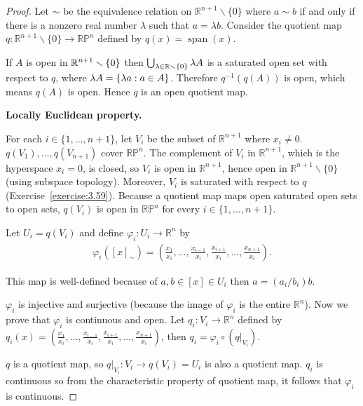 \begin{proof}
	Let $\sim$ be the equivalence relation on $\mathbb{R}^{n+1}\smallsetminus\{0\}$ where $a\sim b$ if and only if there is a nonzero real number $\lambda$ such that $a = \lambda b$. Consider the quotient map $q: \mathbb{R}^{n+1}\smallsetminus\{0\} \to \mathbb{RP}^{n}$ defined by $q(x) = \operatorname{span}(x)$.

	If $A$ is open in $\mathbb{R}^{n+1}\smallsetminus\left\{{0}\right\}$ then $\bigcup_{\lambda\in\mathbb{R}\smallsetminus\left\{{0}\right\}}\lambda A$ is a saturated open set with respect to $q$, where $\lambda A = \left\{{ \lambda a : a\in A }\right\}$. Therefore $q^{-1}(q(A))$ is open, which means $q(A)$ is open. Hence $q$ is an open quotient map.

	\textbf{Locally Euclidean property.}

	For each $i\in \{ 1, \ldots, n+1 \}$, let $V_{i}$ be the subset of $\mathbb{R}^{n+1}$ where $x_{i} \ne 0$. $q(V_{1}), \ldots, q(V_{n+1})$ cover $\mathbb{RP}^{n}$. The complement of $V_{i}$ in $\mathbb{R}^{n+1}$, which is the hyperspace $x_{i} = 0$, is closed, so $V_{i}$ is open in $\mathbb{R}^{n+1}$, hence open in $\mathbb{R}^{n+1}\smallsetminus\{0\}$ (using subspace topology). Moreover, $V_{i}$ is saturated with respect to $q$ (Exercise~\ref{exercise:3.59}). Because a quotient map maps open saturated open sets to open sets, $q(V_{i})$ is open in $\mathbb{RP}^{n}$ for every $i\in \{ 1, \ldots, n+1 \}$.

	Let $U_{i} = q(V_{i})$ and define $\varphi_{i}: U_{i} \to \mathbb{R}^{n}$ by
	\begin{align*}
		\varphi_{i}({[x]}_{\sim}) = \left(\frac{x_{1}}{x_{i}}, \ldots, \frac{x_{i-1}}{x_{i}}, \frac{x_{i+1}}{x_{i}}, \ldots, \frac{x_{n+1}}{x_{i}}\right).
	\end{align*}

	This map is well-defined because of $a, b \in [x]\in U_{i}$ then $a = (a_{i}/b_{i})b$.

	$\varphi_{i}$ is injective and surjective (because the image of $\varphi_{i}$ is the entire $\mathbb{R}^{n}$). Now we prove that $\varphi_{i}$ is continuous and open. Let $q_{i}: V_{i} \to \mathbb{R}^{n}$ defined by $q_{i}(x) = \left(\frac{x_{1}}{x_{i}}, \ldots, \frac{x_{i-1}}{x_{i}}, \frac{x_{i+1}}{x_{i}}, \ldots, \frac{x_{n+1}}{x_{i}}\right)$, then $q_{i} = \varphi_{i}\circ (q\vert_{V_{i}})$.

	$q$ is a quotient map, so $q\vert_{V_{i}}: V_{i} \to q(V_{i}) = U_{i}$ is also a quotient map. $q_{i}$ is continuous so from the characteristic property of quotient map, it follows that $\varphi_{i}$ is continuous.


\end{proof}
